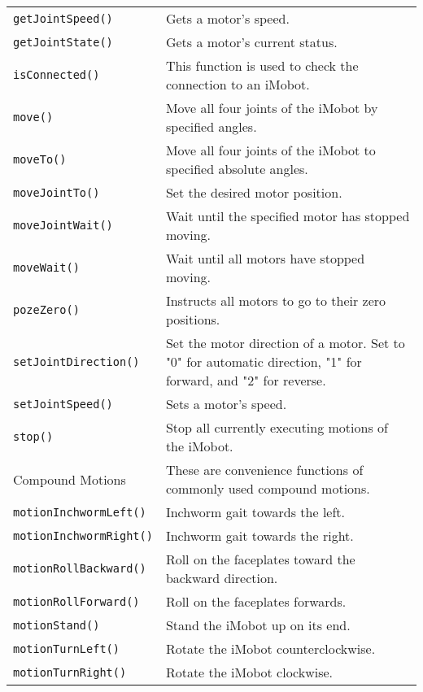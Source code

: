 \begin{table}[!hp]
\begin{center}
\begin{tabular}{p{38 mm}p{77 mm}}
\texttt{getJointSpeed()} \dotfill & Gets a motor's speed. \\
\texttt{getJointState()} \dotfill & Gets a motor's current status. \\
\texttt{isConnected()} \dotfill & This function is used to check the connection to an iMobot. \\
\texttt{move()} \dotfill & Move all four joints of the iMobot by specified angles. \\
\texttt{moveTo()} \dotfill & Move all four joints of the iMobot to specified absolute angles. \\
\texttt{moveJointTo()} \dotfill & Set the desired motor position. \\
\texttt{moveJointWait()} \dotfill & Wait until the specified motor has stopped moving. \\
\texttt{moveWait()} \dotfill & Wait until all motors have stopped moving. \\
\texttt{pozeZero()} \dotfill & Instructs all motors to go to their zero positions. \\
\texttt{setJointDirection()} \dotfill & Set the motor direction of a motor. Set
to "0" for automatic direction, "1" for forward, and "2" for reverse. \\
\texttt{setJointSpeed()} \dotfill & Sets a motor's speed. \\
\texttt{stop()} \dotfill & Stop all currently executing motions of the iMobot. \\
\hline
Compound Motions & These are convenience functions of commonly used compound motions. \\
\hline
\texttt{motionInchwormLeft()} \dotfill & Inchworm gait towards the left. \\
\texttt{motionInchwormRight()} \dotfill & Inchworm gait towards the right. \\
\texttt{motionRollBackward()} \dotfill & Roll on the faceplates toward the backward direction. \\
\texttt{motionRollForward()} \dotfill & Roll on the faceplates forwards. \\
\texttt{motionStand()} \dotfill & Stand the iMobot up on its end. \\
\texttt{motionTurnLeft()} \dotfill & Rotate the iMobot counterclockwise. \\
\texttt{motionTurnRight()} \dotfill & Rotate the iMobot clockwise. \\
\hline
\end{tabular}
\end{center}
\label{mobilec_api_cbinary}
\end{table}

